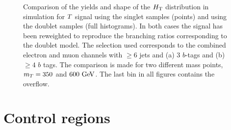 \begin{figure}[htbp]
\begin{center}
\caption{
Comparison of the yields and shape of the $\HT$ distribution in simulation for 
$\T$ signal using the singlet samples (points) and
using the doublet samples (full histograms). In both 
cases the signal has been reweighted to reproduce the 
branching ratios corresponding 
to the doublet model. The selection used corresponds 
to the combined electron and muon channels
with $\geq 6$ jets and 
(a) 3 $b$-tags 
and (b) $\geq 4$ $b$ tags. The comparison is made for two 
different mass points, $m_{\T}=350$ and $600\gev$.
The last bin in all figures contains the overflow.
\label{fig:HT_checks_SingletvsDoubletComp}}
\end{center}
\end{figure}



\section{Control regions}\label{sec:htxCR}

